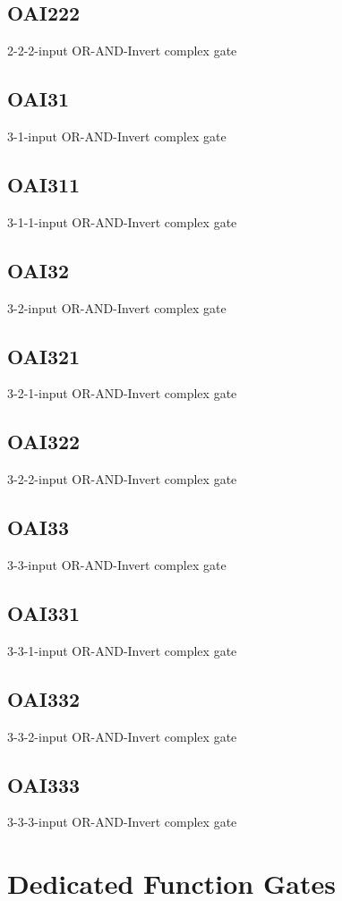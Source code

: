\documentclass[12pt, a4paper, twoside, titlepage]{article}
\begin{document}
\subsection{OAI222}
2-2-2-input OR-AND-Invert complex gate

\subsection{OAI31}
3-1-input OR-AND-Invert complex gate

\subsection{OAI311}
3-1-1-input OR-AND-Invert complex gate

\subsection{OAI32}
3-2-input OR-AND-Invert complex gate

\subsection{OAI321}
3-2-1-input OR-AND-Invert complex gate

\subsection{OAI322}
3-2-2-input OR-AND-Invert complex gate

\subsection{OAI33}
3-3-input OR-AND-Invert complex gate

\subsection{OAI331}
3-3-1-input OR-AND-Invert complex gate

\subsection{OAI332}
3-3-2-input OR-AND-Invert complex gate

\subsection{OAI333}
3-3-3-input OR-AND-Invert complex gate


\section{Dedicated Function Gates}
\end{document}
